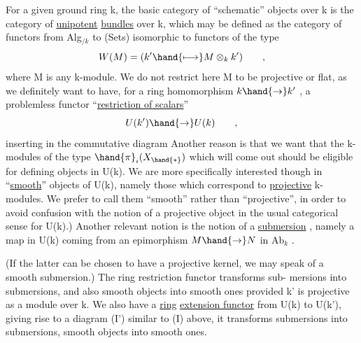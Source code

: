 
For a given ground ring k,  the basic category of ``schematic'' objects
over k is the category of \uline{unipotent} \uline{bundles} over k,  which may be defined
as the category of  functors  from Alg$_{/k}$ to  (Sets)
isomorphic to functors of the type
\[ W(M) = ( k' \hand{\longmapsto} M\otimes_k k' ) \qquad , \]
where M is any k-module.  We do not restrict here M to be projective or
flat,  as we definitely want to have,  for a ring homomorphism $k \hand{\to} k'$ ,
a problemless functor  ``\uline{restriction of scalars}''
\[ U(k') \hand{\to} U(k) \qquad , \]
inserting in the commutative diagram
Another reason is that we want that the k-modules of the type $\hand{\pi}_i(X_{\hand{*}})$
which will come out should be eligible for defining objects in U(k).
We are more specifically interested though in ``\uline{smooth}'' objects of U(k),
namely those which correspond to \uline{projective} k-modules.  \hand{(}We prefer to
call them ``smooth'' rather than ``projective'', in order to avoid confusion
with the notion of a projective object in the usual categorical sense
for U(k).)\hand{\unsure{)}}  Another relevant notion is the notion of a \uline{submersion} ,
namely a map in U(k)  coming from an epimorphism  $M \hand{\to} N$  in Ab$_k$ .

(If the latter can be chosen to have a projective kernel,  we may speak
of a smooth submersion.)  The ring restriction functor transforms sub-%
mersions into submersions,  and also smooth objects into smooth ones
provided k' is projective as a module over k.    We also have a \uline{ring}
\uline{extension functor} from U(k) to U(k'),  giving rise to a diagram (I')
similar to (I) above,  it transforms submersions into submersions,
smooth objects into smooth ones.

